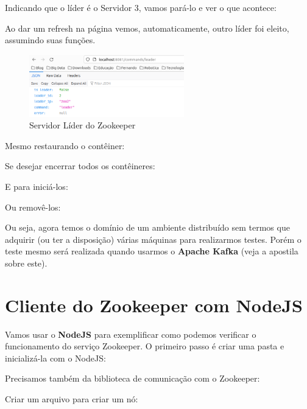 \documentclass[a4paper,11pt]{article}
\begin{document}
Indicando que o líder é o Servidor 3, vamos pará-lo e ver o que acontece: \\

Ao dar um refresh na página vemos, automaticamente, outro líder foi eleito, assumindo suas funções.
\begin{figure}[H]
	\centering
	\includegraphics[width=0.6\textwidth]{imagem/lider2}
	\caption{Servidor Líder do Zookeeper}
\end{figure}

Mesmo restaurando o contêiner: \\

Se desejar encerrar todos os contêineres: \\

E para iniciá-los: \\

Ou removê-los: \\

Ou seja, agora temos o domínio de um ambiente distribuído sem termos que adquirir (ou ter a disposição) várias máquinas para realizarmos testes. Porém o teste mesmo será realizada quando usarmos o \textbf{Apache Kafka} (veja a apostila sobre este).
	
\section{Cliente do Zookeeper com NodeJS}
Vamos usar o \textbf{NodeJS} para exemplificar como podemos verificar o funcionamento do serviço Zookeeper. O primeiro passo é criar uma pasta e inicializá-la com o NodeJS: \\

Precisamos também da biblioteca de comunicação com o Zookeeper: \\

Criar um arquivo para criar um nó: \\
\end{document}
